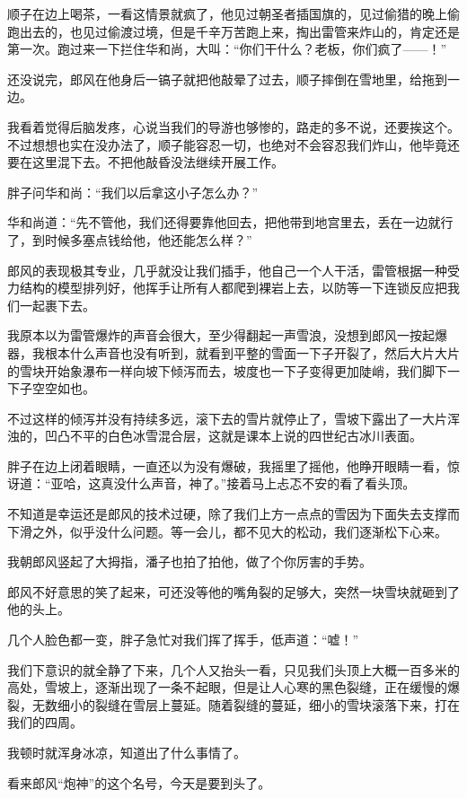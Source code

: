 顺子在边上喝茶，一看这情景就疯了，他见过朝圣者插国旗的，见过偷猎的晚上偷跑出去的，也见过偷渡过境，但是千辛万苦跑上来，掏出雷管来炸山的，肯定还是第一次。跑过来一下拦住华和尚，大叫：“你们干什么？老板，你们疯了——！”

还没说完，郎风在他身后一镐子就把他敲晕了过去，顺子摔倒在雪地里，给拖到一边。

我看着觉得后脑发疼，心说当我们的导游也够惨的，路走的多不说，还要挨这个。不过想想也实在没办法了，顺子能容忍一切，也绝对不会容忍我们炸山，他毕竟还要在这里混下去。不把他敲昏没法继续开展工作。

胖子问华和尚：“我们以后拿这小子怎么办？”

华和尚道：“先不管他，我们还得要靠他回去，把他带到地宫里去，丢在一边就行了，到时候多塞点钱给他，他还能怎么样？”

郎风的表现极其专业，几乎就没让我们插手，他自己一个人干活，雷管根据一种受力结构的模型排列好，他挥手让所有人都爬到裸岩上去，以防等一下连锁反应把我们一起裹下去。

我原本以为雷管爆炸的声音会很大，至少得翻起一声雪浪，没想到郎风一按起爆器，我根本什么声音也没有听到，就看到平整的雪面一下子开裂了，然后大片大片的雪块开始象瀑布一样向坡下倾泻而去，坡度也一下子变得更加陡峭，我们脚下一下子空空如也。

不过这样的倾泻并没有持续多远，滚下去的雪片就停止了，雪坡下露出了一大片浑浊的，凹凸不平的白色冰雪混合层，这就是课本上说的四世纪古冰川表面。

胖子在边上闭着眼睛，一直还以为没有爆破，我摇里了摇他，他睁开眼睛一看，惊讶道：“亚哈，这真没什么声音，神了。”接着马上忐忑不安的看了看头顶。

不知道是幸运还是郎风的技术过硬，除了我们上方一点点的雪因为下面失去支撑而下滑之外，似乎没什么问题。等一会儿，都不见大的松动，我们逐渐松下心来。

我朝郎风竖起了大拇指，潘子也拍了拍他，做了个你厉害的手势。

郎风不好意思的笑了起来，可还没等他的嘴角裂的足够大，突然一块雪块就砸到了他的头上。

几个人脸色都一变，胖子急忙对我们挥了挥手，低声道：“嘘！”

我们下意识的就全静了下来，几个人又抬头一看，只见我们头顶上大概一百多米的高处，雪坡上，逐渐出现了一条不起眼，但是让人心寒的黑色裂缝，正在缓慢的爆裂，无数细小的裂缝在雪层上蔓延。随着裂缝的蔓延，细小的雪块滚落下来，打在我们的四周。

我顿时就浑身冰凉，知道出了什么事情了。

看来郎风“炮神”的这个名号，今天是要到头了。

